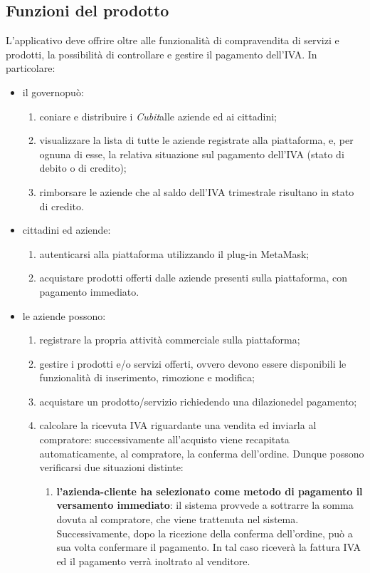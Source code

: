 \subsection{Funzioni del prodotto}
L'applicativo deve offrire oltre alle funzionalità di compravendita di servizi e prodotti, la possibilità di controllare e gestire il pagamento dell'IVA. In particolare: 
\begin{itemize}
	\item il governo\glosp può:
	\begin{enumerate}[label=\alph*.]
		\item coniare e distribuire i \textit{Cubit}\glosp alle aziende ed ai cittadini;
		\item visualizzare la lista di tutte le aziende registrate alla piattaforma, e, per ognuna di esse, la relativa situazione sul pagamento dell'IVA (stato di debito o di credito); 
		\item rimborsare le aziende che al saldo dell'IVA trimestrale risultano in stato di credito.
	\end{enumerate}
	\item cittadini ed aziende:
	\begin{enumerate}[label=\alph*.]
		\item autenticarsi alla piattaforma utilizzando il plug-in MetaMask\glo;
		\item acquistare prodotti offerti dalle aziende presenti sulla piattaforma, con pagamento immediato. 
	\end{enumerate}
	\item le aziende possono:
	\begin{enumerate}[label=\alph*.]
		\item registrare la propria attività commerciale sulla piattaforma;
		\item gestire i prodotti e/o servizi offerti, ovvero devono essere disponibili le funzionalità di inserimento, rimozione e modifica;
		\item acquistare un prodotto/servizio richiedendo una dilazione\glosp del pagamento;
		\item calcolare la ricevuta IVA riguardante una vendita ed inviarla al compratore: successivamente all'acquisto viene recapitata automaticamente, al compratore, la conferma dell'ordine. Dunque possono verificarsi due situazioni distinte:
		\begin{enumerate}[label=\roman*.]
			\item \textbf{l'azienda-cliente ha selezionato come metodo di pagamento il versamento immediato}: il sistema provvede a sottrarre la somma dovuta al compratore, che viene trattenuta nel sistema. Successivamente, dopo la ricezione della conferma dell'ordine, può a sua volta confermare il pagamento. In tal caso riceverà la fattura IVA ed il pagamento verrà inoltrato al venditore. 

\end{enumerate}
\end{enumerate}
\end{itemize}
